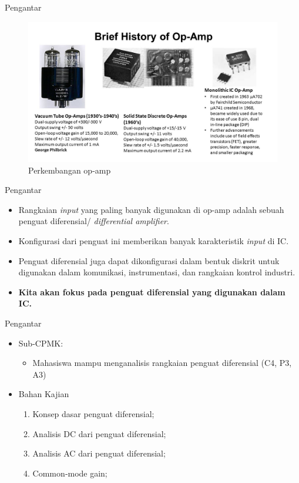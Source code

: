 \documentclass[aspectratio=169]{beamer}
\begin{document}
\begin{frame}{Pengantar}
	\begin{figure}
		\centering
		\includegraphics[height=0.75\textheight]{gambar/history-op-amp}
		\caption{Perkembangan op-amp}
		\label{fig:history-op-amp}
	\end{figure}
\end{frame}

\begin{frame}{Pengantar}
	\begin{itemize}
		\item Rangkaian \textit{input} yang paling banyak digunakan di op-amp adalah sebuah penguat diferensial/ \textit{differential amplifier}.
		\item Konfigurasi dari penguat ini memberikan banyak karakteristik \textit{input} di IC.
		\item Penguat diferensial juga dapat dikonfigurasi dalam bentuk diskrit untuk digunakan dalam komunikasi, instrumentasi, dan rangkaian kontrol industri.
		\item \textbf{Kita akan fokus pada penguat diferensial yang digunakan dalam IC.}
	\end{itemize}
\end{frame}

\begin{frame}{Pengantar}
	\begin{itemize}
		\item Sub-CPMK:
		\begin{itemize}
			\item Mahasiswa mampu
menganalisis rangkaian penguat
diferensial (C4, P3, A3)
		\end{itemize}
		\item Bahan Kajian
		\begin{enumerate}
			\item Konsep dasar penguat diferensial;
			\item Analisis DC dari
penguat diferensial;
			\item Analisis AC dari
penguat diferensial;
			\item Common‐mode gain;
		\end{enumerate}
	\end{itemize}
\end{frame}
\end{document}
